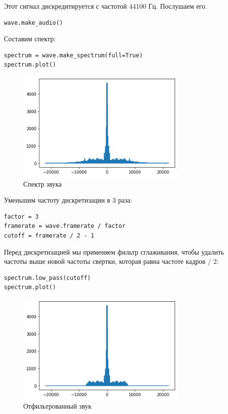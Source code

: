 \documentclass[a4paper,12pt]{report}
\begin{document}
Этот сигнал дискредитируется с частотой 44100 Гц. Послушаем его.

\begin{lstlisting}[caption=Прослушивание звука]
wave.make_audio()
\end{lstlisting}

Составим спектр:

\begin{lstlisting}[caption=Спектр звука]
spectrum = wave.make_spectrum(full=True)
spectrum.plot()
\end{lstlisting}

\begin{figure}[H]
        \centering
        \includegraphics[width=0.75\textwidth]{lab11_fig3_2.png}
        \caption{Спектр звука}
        \label{fig:lab11_fig3_2}
\end{figure}

Уменьшим частоту дискретизации в 3 раза:

\begin{lstlisting}[caption=Уменьшение частоты дискретизации]
factor = 3
framerate = wave.framerate / factor
cutoff = framerate / 2 - 1
\end{lstlisting}

Перед дискретизацией мы применяем фильтр сглаживания, чтобы удалить частоты выше новой частоты свертки, которая равна частоте кадров / 2:

\begin{lstlisting}[caption=Отфильтрованный звук]
spectrum.low_pass(cutoff)
spectrum.plot()
\end{lstlisting}

\begin{figure}[H]
        \centering
        \includegraphics[width=0.75\textwidth]{lab11_fig3_3.png}
        \caption{Отфильтрованный звук}
        \label{fig:lab11_fig3_3}
\end{figure}
\end{document}
